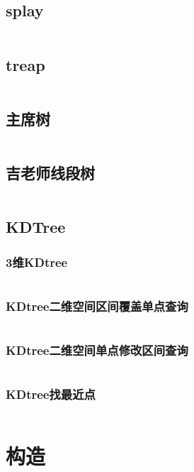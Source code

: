 \documentclass{article}
\begin{document}
\subsection{splay}
\inputminted[breaklines]{c++}{../数据结构/splay.cpp}

\subsection{treap}
\inputminted[breaklines]{c++}{../数据结构/treap.cpp}

\subsection{主席树}
\inputminted[breaklines]{c++}{../数据结构/主席树.cpp}

\subsection{吉老师线段树}
\inputminted[breaklines]{c++}{../数据结构/吉老师线段树.cpp}

\subsection{KDTree}
\subsubsection{3维KDtree}
\inputminted[breaklines]{c++}{../数据结构/3维KDtree.cpp}

\subsubsection{KDtree二维空间区间覆盖单点查询}
\inputminted[breaklines]{c++}{../数据结构/KDtree二维空间区间覆盖单点查询.cpp}

\subsubsection{KDtree二维空间单点修改区间查询}
\inputminted[breaklines]{c++}{../数据结构/KDtree二维空间单点修改区间查询.cpp}

\subsubsection{KDtree找最近点}
\inputminted[breaklines]{c++}{../数据结构/KDtree找最近点.cpp}

\newpage
\section{构造}
\end{document}
